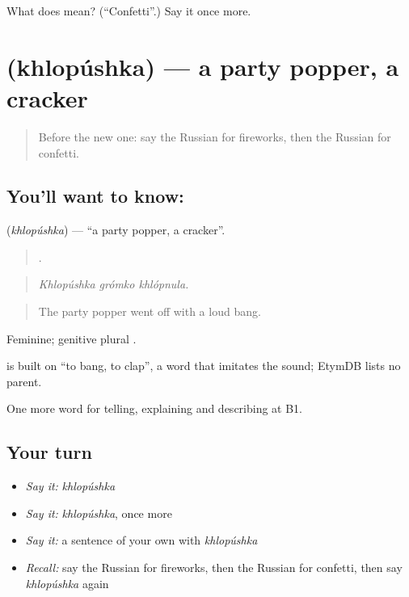 \begin{tcolorbox}[breakable,colback=teal!4,colframe=teal!35!black,title={Before you move on}]
What does  mean? (\textquotedblleft{}Confetti\textquotedblright{}.) Say it once more.
\end{tcolorbox}
\section[\texorpdfstring{\ru{хлопушка} (khlopúshka)}{хлопушка (khlopúshka)}]{ (khlopúshka) — a party popper, a cracker}

\label{lesson:RU-C314-khlopushka}



\begin{quote}
Before the new one: say the Russian for fireworks, then the Russian for confetti.
\end{quote}

\subsection*{You'll want to know: }
\textbf{} (\emph{khlopúshka}) — \textquotedblleft{}a party popper, a cracker\textquotedblright{}.

\begin{quote}
  .
\end{quote}

\begin{quote}
\emph{Khlopúshka grómko khlópnula.}
\end{quote}

\begin{quote}
The party popper went off with a loud bang.
\end{quote}

Feminine; genitive plural \emph{}.

\begin{cousinweb}
\emph{} is built on \emph{} \textquotedblleft{}to bang, to clap\textquotedblright{}, a word that imitates the sound; EtymDB lists no parent.
\end{cousinweb}

\begin{grammarlens}[title={What you've built}]
One more word for telling, explaining and describing at B1.
\end{grammarlens}

\subsection*{Your turn}
\begin{itemize}
\raggedright
  \item \emph{Say it:} \emph{khlopúshka}
  \item \emph{Say it:} \emph{khlopúshka}, once more
  \item \emph{Say it:} a sentence of your own with \emph{khlopúshka}
  \item \emph{Recall:} say the Russian for fireworks, then the Russian for confetti, then say \emph{khlopúshka} again
\end{itemize}


